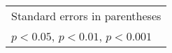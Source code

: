\begin{table}[htbp]
{\begin{tabular}{l*{4}{c}}
            \bottomrule
            \multicolumn{5}{l}{\footnotesize Standard errors in parentheses}                                                                                                                                     \\
            \multicolumn{5}{l}{\footnotesize \sym{*} \(p<0.05\), \sym{**} \(p<0.01\), \sym{***} \(p<0.001\)}                                                                                                     \\
        \end{tabular}
    }
\end{table}